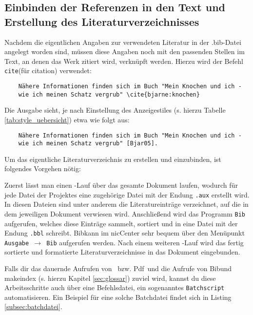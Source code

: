 \subsection{Einbinden der Referenzen in den Text und Erstellung des
Literaturverzeichnisses}
Nachdem die eigentlichen Angaben zur verwendeten Literatur in der .bib-Datei
angelegt worden sind, müssen diese Angaben noch mit den passenden Stellen im
Text, an denen das Werk zitiert wird, verknüpft werden.
Hierzu wird der Befehl \texttt{cite{}}(für citation) verwendet:
\begin{verbatim}
	Nähere Informationen finden sich im Buch "Mein Knochen und ich -
	wie ich meinen Schatz vergrub" \cite{bjarne:knochen}
\end{verbatim}
\newpage
Die Ausgabe sieht, je nach Einstellung des Anzeigestiles (s. hierzu Tabelle
\ref{tab:style_uebersicht}) etwa wie folgt aus:
\begin{verbatim}
	Nähere Informationen finden sich im Buch "Mein Knochen und ich -
	wie ich meinen Schatz vergrub" [Bjar05].
\end{verbatim}
Um das eigentliche Literaturverzeichnis zu erstellen und einzubinden, ist folgendes Vorgehen
nötig:

Zuerst lässt man einen \DMLLaTeX-Lauf über das gesamte Dokument laufen, wodurch
für jede Datei der Projektes eine zugehörige Datei mit der Endung \texttt{.aux}
erstellt wird. In diesen Dateien sind unter anderem die Literatureinträge
verzeichnet, auf die in dem jeweiligen Dokument verwiesen wird.
Anschließend wird das Programm \texttt{Bib\DMLTeX} aufgerufen, welches diese Einträge
sammelt, sortiert und in eine Datei mit der Endung \texttt{.bbl} schreibt.
Bib\DMLTeX kann im \DMLTeX nicCenter sehr bequem über den Menüpunkt \texttt{Ausgabe
$\rightarrow$ Bib\DMLTeX} aufgerufen werden. Nach einem weiteren \DMLLaTeX-Lauf wird
das fertig sortierte und formatierte Literaturverzeichnisse in das Dokument
eingebunden.

Falls dir das dauernde Aufrufen von \DMLLaTeX \ bzw. Pdf\DMLTeX \ und die Aufrufe von
Bib\DMLTeX und makeindex (s. hierzu Kapitel \ref{sec:glossar}) zuviel wird, kannst du diese
Arbeitsschritte auch über eine Befehlsdatei, ein sogenanntes \texttt{Batchscript}
automatisieren. Ein Beispiel für eine solche Batchdatei findet sich in Listing
\ref{subsec:batchdatei}.
